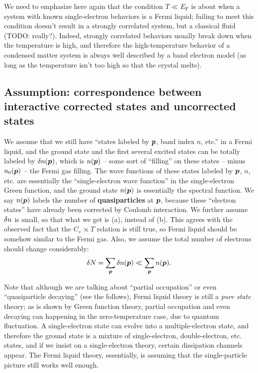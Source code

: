 \documentclass[hyperref, a4paper]{article}
\newcommand*{\concept}[1]{{\textbf{#1}}}
\newcommand*{\efermi}{E_{\text{F}}}
\begin{document}
We need to emphasize here again 
that the condition $T \ll \efermi$
is about when a system with known single-electron behaviors 
is a Fermi liquid;
failing to meet this condition 
doesn't result in a strongly correlated system, 
but a classical fluid (TODO: really?).
Indeed, strongly correlated behaviors usually break down 
when the temperature is high, 
and therefore the high-temperature behavior 
of a condensed matter system 
is always well described by a band electron model 
(as long as the temperature isn't too high 
so that the crystal melts).

\subsection{Assumption: correspondence between interactive corrected states and uncorrected states}\label{sec:fermi-liquid.assumption-1}

We assume that we still have ``states labeled by $\vb*{p}$, band index $n$, etc.'' 
in a Fermi liquid,
and the ground state and the first several excited states 
can be totally labeled by $\var{n(\vb*{p})}$,
which is $n(\vb*{p})$ -- some sort of ``filling'' on these states -- 
minus $n_0(\vb*{p})$ -- the Fermi gas filling. 
The wave functions of  these states labeled by $\vb*{p}$, $n$, etc. 
are essentially the ``single-electron wave function''
in the single-electron Green function, 
and the ground state $n(\vb*{p})$ is essentially the spectral function.
We say $n(\vb*{p})$ labels the number of \concept{quasiparticles} at $\vb*{p}$,
because these ``electron states'' have already been corrected by Coulomb interaction.
We further assume $\var{n}$ is small, so that what we get is (a),
instead of (b).
This agrees with the observed fact that the $C_v \propto T$ relation is still true,
so Fermi liquid should be somehow similar to the Fermi gas. 
Also, we assume the total number of electrons 
should change considerably:
\begin{equation}
    \var{N} = \sum_{\vb*{p}} \var{n(\vb*{p})} \ll \sum_{\vb*{p}} n(\vb*{p}). 
\end{equation}

Note that although we are talking about ``partial occupation''
or even ``quasiparticle decaying'' (see the follows), 
Fermi liquid theory is still a \emph{pure state} theory; 
as is shown by Green function theory, 
partial occupation and even decaying can happening 
in the zero-temperature case, 
due to quantum fluctuation.
A single-electron state can evolve into a multiple-electron state, 
and therefore the ground state is a mixture of single-electron, double-electron, etc. states, 
and if we insist on a single-electron theory,
certain dissipation channels appear.
The Fermi liquid theory, essentially, 
is assuming that the single-particle picture still works well enough.
\end{document}
